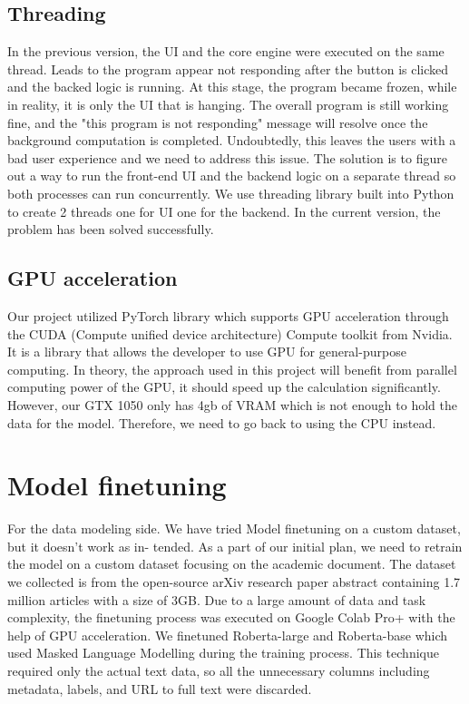 \documentclass[12pt,oneside,openright,a4paper]{cpe-english-project}
\begin{document}
\subsection{Threading}
In the previous version, the UI and the core engine were executed on the same thread. Leads to the program appear not responding after the button is clicked and the backed logic is running. At this stage, the program became frozen, while in reality, it is only the UI that is hanging. The overall program is still working fine, and the "this program is not responding" message will resolve once the background computation is completed. Undoubtedly, this leaves the users with a bad user experience and we need to address this issue. The solution is to figure out a way to run the front-end UI and the backend logic on a separate thread so both processes can run concurrently. We use threading library built into Python to create 2 threads one for UI one for the backend. In the current version, the problem has been solved successfully.



\subsection{GPU acceleration}

Our project utilized PyTorch library which supports GPU acceleration through the CUDA (Compute unified device architecture) Compute toolkit from Nvidia. It is a library that allows the developer to use GPU for general-purpose computing. In theory, the approach used in this project will benefit from parallel computing power of the GPU, it should speed up the calculation significantly. However, our GTX 1050 only has 4gb of VRAM which is not enough to hold the data for the model. Therefore, we need to go back to using the CPU instead.
\section{Model finetuning}

For the data modeling side. We have tried Model finetuning on a custom dataset, but it doesn’t work as in- tended. As a part of our initial plan, we need to retrain the model on a custom dataset focusing on the academic document. The dataset we collected is from the open-source arXiv research paper abstract containing 1.7 million articles with a size of 3GB. Due to a large amount of data and task complexity, the finetuning process was executed on Google Colab Pro+ with the help of GPU acceleration. We finetuned Roberta-large and Roberta-base which used Masked Language Modelling during the training process. This technique required only the actual text data, so all the unnecessary columns including metadata, labels, and URL to full text were discarded. 
\end{document}
